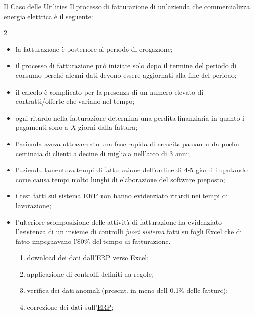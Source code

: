 \begin{example}{Il Caso delle Utilities}{}
    Il processo di fatturazione di un'azienda che commercializza energia elettrica è il seguente:
    \begin{multicols}{2}
        \begin{itemize}
            \item la fatturazione è posteriore al periodo di erogazione;
            \item il processo di fatturazione può iniziare solo dopo il termine del periodo di consumo perché alcuni dati devono essere aggiornati alla fine del periodo;
            \item il calcolo è complicato per la presenza di un numero elevato di contratti/offerte che variano nel tempo;
            \item ogni ritardo nella fatturazione determina una perdita finanziaria in quanto i pagamenti sono a $X$ giorni dalla fattura;
            \item l'azienda aveva attraversato una fase rapida di crescita passando da poche centinaia di clienti a decine di migliaia nell'arco di 3 anni;
            \item l'azienda lamentava tempi di fatturazione dell'ordine di 4-5 giorni imputando come causa tempi molto lunghi di elaborazione del software preposto;
            \item i test fatti sul sistema \hyperref[sec:i_sistemi_erp]{ERP} non hanno evidenziato ritardi nei tempi di lavorazione;
            \item l'ulteriore scomposizione delle attività di fatturazione ha evidenziato l'esistenza di un insieme di controlli \textit{fuori sistema} fatti su fogli Excel che di fatto impegnavano l'80\% del tempo di fatturazione.
                \begin{enumerate}
                    \item download dei dati dall'\hyperref[sec:i_sistemi_erp]{ERP} verso Excel;
                    \item applicazione di controlli definiti da regole;
                    \item verifica dei dati anomali (presenti in meno dell 0.1\% delle fatture);
                    \item correzione dei dati sull'\hyperref[sec:i_sistemi_erp]{ERP};
                \end{enumerate}
        \end{itemize}
    \end{multicols}

\end{example}

